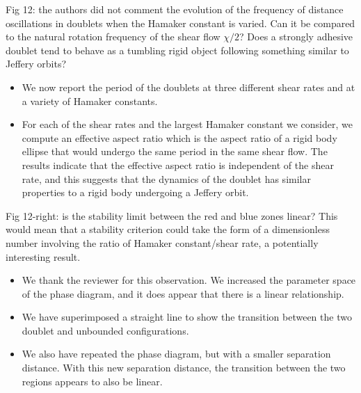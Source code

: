 \documentclass[11pt]{article}
\newcommand{\comment}[1]{{\color{blue} #1}}
\begin{document}
\noindent
\comment{Fig 12: the authors did not comment the evolution of the
frequency of distance oscillations in doublets when the Hamaker constant
is varied. Can it be compared to the natural rotation frequency of the
shear flow $\chi/2$? Does a strongly adhesive doublet tend to behave as
a tumbling rigid object following something similar to Jeffery orbits?}
\begin{itemize}
  \item We now report the period of the doublets at three different
    shear rates and at a variety of Hamaker constants.

  \item For each of the shear rates and the largest Hamaker constant we
    consider, we compute an effective aspect ratio which is the aspect
    ratio of a rigid body ellipse that would undergo the same period in
    the same shear flow.  The results indicate that the effective aspect
    ratio is independent of the shear rate, and this suggests that the
    dynamics of the doublet has similar properties to a rigid body
    undergoing a Jeffery orbit. 
\end{itemize}

\noindent
\comment{Fig 12-right: is the stability limit between the red and blue
zones linear? This would mean that a stability criterion could take
the form of a dimensionless number involving the ratio of Hamaker
constant/shear rate, a potentially interesting result.}
\begin{itemize}
  \item We thank the reviewer for this observation.  We increased the
    parameter space of the phase diagram, and it does appear that there
    is a linear relationship.
  \item We have superimposed a straight line to show the transition
    between the two doublet and unbounded configurations.
  \item We also have repeated the phase diagram, but with a smaller
    separation distance.  With this new separation distance, the
    transition between the two regions appears to also be linear.
\end{itemize}
\end{document}
